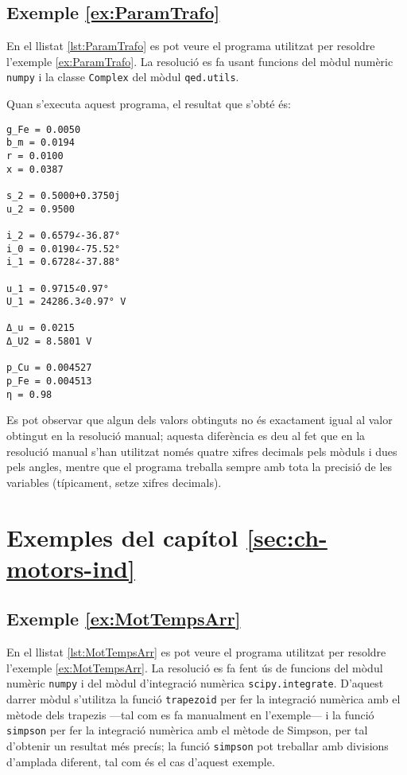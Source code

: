 \hypertarget{exemple:ParamTrafo}{\subsection{Exemple \ref*{ex:ParamTrafo} \ParamTrafo}}
En el llistat \vref{lst:ParamTrafo} es pot veure el programa utilitzat per resoldre l'exemple \vref{ex:ParamTrafo}. La resolució es fa usant funcions del mòdul numèric \texttt{numpy} i la classe  \texttt{Complex} del mòdul \texttt{qed.utils}.


Quan s'executa aquest programa, el resultat que s'obté és:
\lstset{
	language=,
	numbers=none,
	frame=none
}
\begin{lstlisting}
g_Fe = 0.0050
b_m = 0.0194
r = 0.0100
x = 0.0387

s_2 = 0.5000+0.3750j
u_2 = 0.9500

i_2 = 0.6579∠-36.87°
i_0 = 0.0190∠-75.52°
i_1 = 0.6728∠-37.88°

u_1 = 0.9715∠0.97°
U_1 = 24286.3∠0.97° V

Δ_u = 0.0215
Δ_U2 = 8.5801 V

p_Cu = 0.004527
p_Fe = 0.004513
η = 0.98
\end{lstlisting} 

Es pot observar que algun dels valors obtinguts no és exactament igual al valor obtingut en la resolució manual; aquesta diferència es deu  al fet que en la resolució manual s'han utilitzat només quatre xifres decimals pels mòduls i dues pels angles, mentre que el programa treballa sempre amb tota la precisió de les variables (típicament, setze xifres decimals).




\section{Exemples del capítol \ref*{sec:ch-motors-ind}}

\hypertarget{exemple:MotTempsArr}{\subsection{Exemple \ref*{ex:MotTempsArr} \MotTempsArr}}
En el llistat \vref{lst:MotTempsArr} es pot veure el programa utilitzat per resoldre l'exemple \vref{ex:MotTempsArr}. La resolució es fa fent ús de funcions del mòdul numèric \texttt{numpy} i del mòdul d'integració numèrica \texttt{scipy.integrate}. D'aquest darrer mòdul s'utilitza la funció \texttt{trapezoid} per fer la integració numèrica amb el mètode dels trapezis ---tal com es fa manualment en l'exemple--- i la funció \texttt{simpson} per fer la integració numèrica amb el mètode de Simpson, per tal d'obtenir un resultat més precís; la funció \texttt{simpson} pot treballar amb divisions d'amplada diferent, tal com és el cas d'aquest exemple. 


